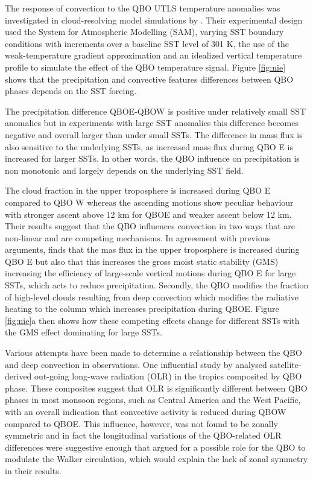  The response of convection to the QBO UTLS temperature anomalies was investigated in cloud-resolving model simulations by \cite{nie2015}. Their experimental design used the System for Atmospheric Modelling (SAM), varying SST boundary conditions with increments over a baseline SST level of 301 K, the use of the weak-temperature gradient approximation and an idealized vertical temperature profile to simulate the effect of the QBO temperature signal. 
 Figure \ref{fig:nie} shows that the precipitation and convective features differences between QBO phases depends on the SST forcing.  
 
 The precipitation difference QBOE-QBOW is positive under relatively small SST anomalies but in experiments with large SST anomalies this difference becomes negative and overall larger than under small SSTs. The difference in mass flux is also sensitive to the underlying SSTs, as increased mass flux during QBO E is increased for larger SSTs.  In other words, the QBO influence on precipitation is non monotonic and largely depends on the underlying SST field.
 
  The cloud fraction in the upper troposphere is increased during QBO E compared to QBO W whereas the ascending motions show peculiar behaviour with stronger ascent above 12 km for QBOE and weaker ascent below 12 km. 
  Their results suggest that the QBO influences convection in two ways that are non-linear and are competing mechanisms. In agreeement with previous arguments, \cite{nie2015} finds that the mas flux in the upper troposphere is increased during QBO E but also that this increases the gross moist static stability (GMS) increasing the efficiency of large-scale vertical motions during QBO E for large SSTs, which acts to reduce precipitation.  Secondly, the QBO modifies the fraction of high-level clouds resulting from deep convection which modifies the radiative heating to the column which increases precipitation during QBOE.  Figure \ref{fig:nie}a then shows how these competing effects change for different SSTs with the GMS effect dominating for large SSTs.

Various attempts have been made to determine a relationship between the QBO and deep convection in observations. 
One influential study by \cite{collimore2003} analysed satellite-derived out-going long-wave radiation (OLR) in the tropics composited by QBO phase. These composites suggest that OLR is significantly different between QBO phases in most monsoon regions, such as Central America  and the West Pacific, with an overall indication that convective activity is reduced during QBOW compared to QBOE. This influence, however, was not found to be zonally symmetric and in fact the longitudinal variations of the QBO-related OLR differences were suggestive enough that \cite{collimore2003} argued for a possible role for the QBO to modulate the Walker circulation, which would explain the lack of zonal symmetry in their results. 



